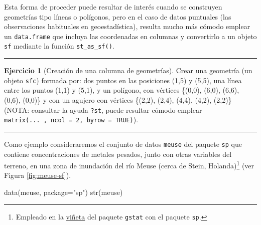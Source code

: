 \documentclass[
  spanish,
]{book}
\newenvironment{Shaded}{\begin{snugshade}}{\end{snugshade}}
\newcommand{\AttributeTok}[1]{\textcolor[rgb]{0.77,0.63,0.00}{#1}}
\newcommand{\FunctionTok}[1]{\textcolor[rgb]{0.00,0.00,0.00}{#1}}
\newcommand{\NormalTok}[1]{#1}
\newcommand{\StringTok}[1]{\textcolor[rgb]{0.31,0.60,0.02}{#1}}
\theoremstyle{break}
\theoremstyle{definition}
\theoremstyle{definition}
\theoremstyle{definition}
\newtheorem{exercise}{Ejercicio}[chapter]
\theoremstyle{definition}
\theoremstyle{remark}
\begin{document}
Esta forma de proceder puede resultar de interés cuando se construyen geometrías tipo líneas o polígonos, pero en el caso de datos puntuales (las observaciones habituales en geoestadística), resulta mucho más cómodo emplear un \texttt{data.frame} que incluya las coordenadas en columnas y convertirlo a un objeto \texttt{sf} mediante la función \texttt{st\_as\_sf()}.

\begin{center}\rule{0.5\linewidth}{0.5pt}\end{center}

\begin{exercise}[Creación de una columna de geometrías]
\protect\hypertarget{exr:sfc}{}{\label{exr:sfc} {} }Crear una geometría (un objeto \texttt{sfc}) formada por: dos puntos en las posiciones
(1,5) y (5,5), una línea entre los puntos (1,1) y (5,1), y un polígono, con vértices
\{(0,0), (6,0), (6,6), (0,6), (0,0)\} y con un agujero con vértices \{(2,2), (2,4),
(4,4), (4,2), (2,2)\} (NOTA: consultar la ayuda \texttt{?st}, puede resultar cómodo emplear
\texttt{matrix(...\ ,\ ncol\ =\ 2,\ byrow\ =\ TRUE)}).
\end{exercise}

\begin{center}\rule{0.5\linewidth}{0.5pt}\end{center}

Como ejemplo consideraremos el conjunto de datos \texttt{meuse} del paquete \texttt{sp} que contiene concentraciones de metales pesados, junto con otras variables del terreno, en una zona de inundación del río Meuse (cerca de Stein, Holanda)\footnote{Empleado en la \href{https://cran.r-project.org/web/packages/gstat/vignettes/gstat.pdf}{viñeta} del paquete \texttt{gstat} con el paquete \texttt{sp}.} (ver Figura \ref{fig:meuse-sf}).

\begin{Shaded}
\begin{Highlighting}[]
\FunctionTok{data}\NormalTok{(meuse, }\AttributeTok{package=}\StringTok{"sp"}\NormalTok{)}
\FunctionTok{str}\NormalTok{(meuse)}
\end{Highlighting}
\end{Shaded}
\end{document}
